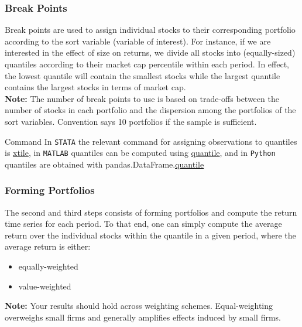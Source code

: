 \documentclass[xcolor=dvipsnames, english, 8pt]{beamer}
\begin{document}
\begin{frame}
    \frametitle{Break Points}
    Break points are used to assign individual stocks to their corresponding portfolio {\color{ubRed}according to the sort variable} (variable of interest). For instance, if we are interested in the effect of size on returns, we divide all stocks into (equally-sized) {\color{ubRed}quantiles} according to their market cap percentile {\color{ubRed} within each period}. In effect, the lowest quantile will contain the smallest stocks while the largest quantile contains the largest stocks in terms of market cap.\vspace{0.5cm}\\

        \textbf{Note:} The number of break points to use is based on trade-offs between the number of stocks in each portfolio and the dispersion among the portfolios of the sort variables. Convention says 10 portfolios if the sample is sufficient.
        \vfill
        \begin{exampleblock}{{\small{Command}}}
        In  \texttt{STATA} the relevant command for assigning observations to quantiles is \href{https://www.stata.com/manuals13/dpctile.pdf}{\color{Purple}xtile}, in  \texttt{MATLAB} quantiles can be computed using \href{https://ch.mathworks.com/help/stats/quantile.html}{\color{Purple}quantile}, and in \texttt{Python} quantiles are obtained with pandas.DataFrame.\href{https://pandas.pydata.org/pandas-docs/stable/reference/api/pandas.DataFrame.quantile.html}{\color{Purple}quantile}
        \end{exampleblock}
\end{frame}

\begin{frame}
    \frametitle{Forming Portfolios}
    The second and third steps consists of forming portfolios and compute the return time series {\color{ubRed} for each period}. To that end, one can simply compute the average return over the individual stocks within the quantile in a given period, where the average return is either:\vspace{0.25cm}\\
    \begin{itemize}
        \item equally-weighted
        \item value-weighted\vspace{0.5cm}\\
    \end{itemize}

    \textbf{Note:} Your results should hold across weighting schemes. Equal-weighting overweighs small firms and generally amplifies effects induced by small firms.
\end{frame}
\end{document}
